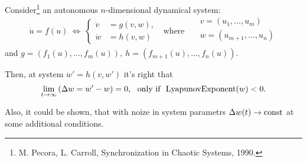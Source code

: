 Consider\footnote{
    M. Pecora, L. Carroll, Synchronization in Chaotic Systems, 1990.
}  an autonomous $n$-dimensional dynamical system:
\begin{equation*}
    \dot{u} = f(u)
    \ \Leftrightarrow \
    \left\{\begin{aligned}
        \dot{v} &= g(v, w), \\
        \dot{w} &= h(v, w)
    \end{aligned}\right.
    \ \ \ \text{where} \ \ \
    \begin{aligned}
        &v = (u_1, \ldots, u_m) \\
        &w = (u_{m+1}, \ldots, u_n) \\
    \end{aligned}
\end{equation*}
and $g = (f_{1}(u), \ldots, f_m(u)), \ h = (f_{m+1}(u), \ldots, f_n(u))$.

Then, at system $\dot{w}' = h(v, w')$ it's right that
\begin{equation*}
    \lim_{t \to \infty} \left(\Delta w = w' - w\right) = 0,
    \ \  \text{only if} \ \
    \textnormal{LyapunovExponent}(w) < 0.
\end{equation*}

Also, it could be shown, that with noize in system parametrs $\Delta w(t) \to \text{const}$ at some additional conditions.
